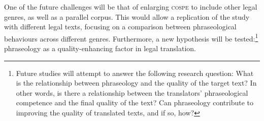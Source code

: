 \documentclass[output=paper]{LSP/langsci}
\begin{document}
One of the future challenges will be that of enlarging \textsc{cospe} to include other legal genres, as well as a parallel corpus. This would allow a replication of the study with different legal texts, focusing on a comparison between phraseological behaviours across different genres. Furthermore, a new hypothesis will be tested:\footnote{Future studies will attempt to answer the following research question: What is the relationship between phraseology and the quality of the target text? In other words, is there a relationship between the translators’ phraseological competence and the final quality of the text? Can phraseology contribute to improving the quality of translated texts, and if so, how?} phraseology as a quality-enhancing factor in legal translation.

 


\printbibliography[heading=subbibliography,notkeyword=this]
\end{document}
